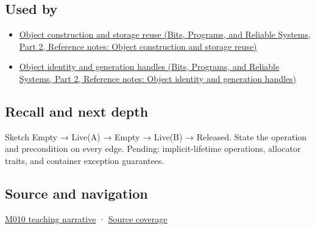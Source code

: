 \subsection{Used by}\label{appendix-f56c3e43fd4e-used-by}

\hypertarget{appendix-f56c3e43fd4e-used-by}{}

\begin{itemize}
\tightlist
\item
  \href{../01-Bits-Programs-and-Reliable-Systems-P02/main.pdf\#appendix-a82f9c438857}{Object construction and storage reuse (Bits, Programs, and Reliable Systems, Part 2, Reference notes: Object construction and storage reuse)}
\item
  \href{../01-Bits-Programs-and-Reliable-Systems-P02/main.pdf\#appendix-f1581457d322}{Object identity and generation handles (Bits, Programs, and Reliable Systems, Part 2, Reference notes: Object identity and generation handles)}
\end{itemize}

\subsection{Recall and next depth}\label{appendix-f56c3e43fd4e-recall-and-next-depth}

\hypertarget{appendix-f56c3e43fd4e-recall-and-next-depth}{}

Sketch Empty → Live(A) → Empty → Live(B) → Released. State the operation and precondition on every edge. Pending: implicit-lifetime operations, allocator traits, and container exception guarantees.

\subsection{Source and navigation}\label{appendix-f56c3e43fd4e-source-and-navigation}

\hypertarget{appendix-f56c3e43fd4e-source-and-navigation}{}

\hyperref[01-foundations-i-ch004-placement-construction-reuses-storage-it-does-not-allocate-it]{M010 teaching narrative} · \hyperref[appendix-fd090d982a15-m010---parts-148-160]{Source coverage}
